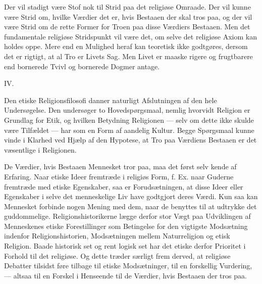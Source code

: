 \documentclass[12pt,a4paper]{article}
\newcommand{\snum}[1]{\bigskip\begin{center}#1\end{center}\nopagebreak\medskip}
\newcommand{\opage}[1]{\marginnote{\footnotesize\textit{[#1]}}}
\begin{document}
Der vil stadigt være Stof nok til Strid paa det religiøse Omraade. Der vil
kunne være Strid om, hvilke Værdier det er, hvis Bestaaen der skal tros paa, og
der vil være Strid om de rette Former for Troen paa disse Værdiers Bestaaen.
Men det fundamentale religiøse Stridspunkt vil være det, om selve det religiøse
Axiom kan holdes oppe. Mere end en Mulighed heraf kan teoretisk ikke godtgøres,
dersom det er rigtigt, at al Tro er Livets Sag. Men Livet er maaske rigere og
frugtbarere end bornerede Tvivl og bornerede Dogmer antage.

\snum{IV.}

Den etiske Religionsfilosofi danner naturligt Afslutningen af den hele
Undersøgelse. Den undersøger to Hovedspørgsmaal, nemlig hvorvidt Religion er
Grundlag for Etik, og hvilken Betydning Religionen --- selv om dette ikke
skulde være Tilfældet --- har som en Form af aandelig Kultur. Begge Spørgsmaal
kunne vinde i Klarhed ved Hjælp af den Hypotese, at Tro paa Værdiens Bestaaen
er det væsentlige i Religionen.

De Værdier, hvis Bestaaen Mennesket tror paa, maa det først selv kende af
Erfaring. Naar etiske Ideer fremtræde i religiøs Form, f. Ex. naar Guderne
fremtræde med etiske Egenskaber, saa er Forudsætningen, at disse Ideer eller
Egenskaber i selve det menneskelige Liv have godtgjort deres Værdi. Kun saa kan
Mennesket forbinde nogen Mening med dem, naar de benyttes til at udtrykke det
guddommelige. Religionshistorikerne lægge derfor stor Vægt paa Udviklingen af
Menneskenes etiske
\opage{420} Forestillinger som Betingelse for den vigtigste Modsætning indenfor
Religionshistorien, Modsætningen mellem Naturreligion og etisk Religion. Baade
historisk set og rent logisk set har det etiske derfor Prioritet i Forhold til
det religiøse. Og dette træder særligt frem derved, at religiøse Debatter
tilsidst føre tilbage til etiske Modsætninger, til en forskellig Vurdering, ---
altsaa til en Forskel i Henseende til de Værdier, hvis Bestaaen der tros paa.
\end{document}
